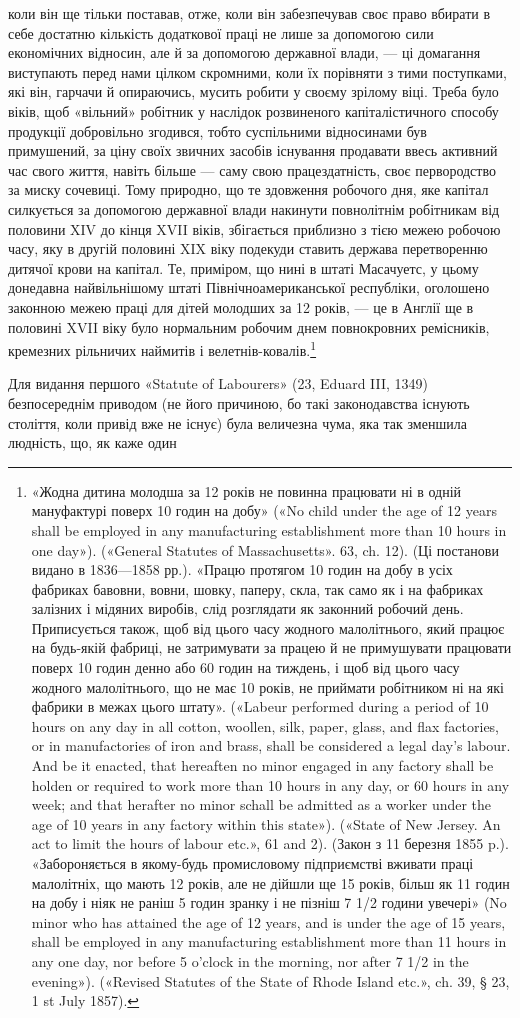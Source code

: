 коли він ще тільки поставав, отже, коли він забезпечував своє
право вбирати в себе достатню кількість додаткової праці не
лише за допомогою сили економічних відносин, але й за допомогою
державної влади, — ці домагання виступають перед нами
цілком скромними, коли їх порівняти з тими поступками, які
він, гарчачи й опираючись, мусить робити у своєму зрілому віці.
Треба було віків, щоб «вільний» робітник у наслідок розвиненого
капіталістичного способу продукції добровільно згодився, тобто
суспільними відносинами був примушений, за ціну своїх звичних
засобів існування продавати ввесь активний час свого
життя, навіть більше — саму свою працездатність, своє первородство
за миску сочевиці. Тому природно, що те здовження
робочого дня, яке капітал силкується за допомогою державної
влади накинути повнолітнім робітникам від половини XIV до
кінця XVII віків, збігається приблизно з тією межею робочою
часу, яку в другій половині XIX віку подекуди ставить держава
перетворенню дитячої крови на капітал. Те, приміром, що нині
в штаті Масачуетс, у цьому донедавна найвільнішому штаті
Північноамериканської республіки, оголошено законною межею
праці для дітей молодших за 12 років, — це в Англії ще в половині
XVII віку було нормальним робочим днем повнокровних ремісників,
кремезних рільничих наймитів і велетнів-ковалів.\footnote{
«Жодна дитина молодша за 12 років не повинна працювати ні в
одній мануфактурі поверх 10 годин на добу» («No child under the age
of 12 years shall be employed in any manufacturing establishment more
than 10 hours in one day»). («General Statutes of Massachusetts». 63, ch. 12).
(Ці постанови видано в 1836—1858 рр.). «Працю протягом 10 годин на
добу в усіх фабриках бавовни, вовни, шовку, паперу, скла, так само як
і на фабриках залізних і мідяних виробів, слід розглядати як законний
робочий день. Приписується також, щоб від цього часу жодного малолітнього,
який працює на будь-якій фабриці, не затримувати за працею й
не примушувати працювати поверх 10 годин денно або 60 годин на тиждень,
і щоб від цього часу жодного малолітнього, що не має 10 років, не приймати
робітником ні на які фабрики в межах цього штату». («Labeur performed
during a period of 10 hours on any day in all cotton, woollen, silk,
paper, glass, and flax factories, or in manufactories of iron and brass,
shall be considered a legal day’s labour. And be it enacted, that hereaften
no minor engaged in any factory shall be holden or required to work more
than 10 hours in any day, or 60 hours in any week; and that herafter no
minor schall be admitted as a worker under the age of 10 years in any factory
within this state»). («State of New Jersey. An act to limit the hours of labour
etc.», 61 and 2). (Закон з 11 березня 1855 p.). «Забороняється в якому-будь
промисловому підприємстві вживати праці малолітніх, що мають
12 років, але не дійшли ще 15 років, більш як 11 годин на добу і ніяк не
раніш 5 годин зранку і не пізніш 7 1/2 години увечері» (No minor who has
attained the age of 12 years, and is under the age of 15 years, shall be employed
in any manufacturing establishment more than 11 hours in any one day,
nor before 5 o’clock in the morning, nor after 7 1/2 in the evening»). («Revised
Statutes of the State of Rhode Island etc.», ch. 39, § 23, 1 st July 1857).
}

Для видання першого «Statute of Labourers» (23, Eduard
III, 1349) безпосереднім приводом (не його причиною, бо такі
законодавства існують століття, коли привід вже не існує) була
величезна чума, яка так зменшила людність, що, як каже один